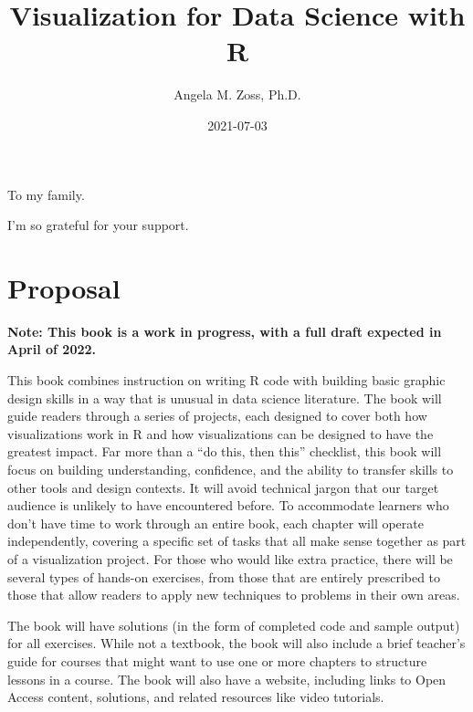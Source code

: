 \documentclass[
]{krantz}
\title{Visualization for Data Science with R}
\author{Angela M. Zoss, Ph.D.}
\date{2021-07-03}
\begin{document}
\maketitle


\thispagestyle{empty}

\begin{center}
To my family.

I'm so grateful for your support.
\end{center}

\setlength{\abovedisplayskip}{-5pt}
\setlength{\abovedisplayshortskip}{-5pt}

{
\hypersetup{linkcolor=}
\setcounter{tocdepth}{2}
\tableofcontents
}
\listoftables
\listoffigures
\hypertarget{proposal}{%
\chapter*{Proposal}\label{proposal}}


\textbf{Note: This book is a work in progress, with a full draft expected in April of 2022.}

This book combines instruction on writing R code with building basic graphic design skills in a way that is unusual in data science literature. The book will guide readers through a series of projects, each designed to cover both how visualizations work in R and how visualizations can be designed to have the greatest impact. Far more than a ``do this, then this'' checklist, this book will focus on building understanding, confidence, and the ability to transfer skills to other tools and design contexts. It will avoid technical jargon that our target audience is unlikely to have encountered before. To accommodate learners who don't have time to work through an entire book, each chapter will operate independently, covering a specific set of tasks that all make sense together as part of a visualization project. For those who would like extra practice, there will be several types of hands-on exercises, from those that are entirely prescribed to those that allow readers to apply new techniques to problems in their own areas.

The book will have solutions (in the form of completed code and sample output) for all exercises. While not a textbook, the book will also include a brief teacher's guide for courses that might want to use one or more chapters to structure lessons in a course. The book will also have a website, including links to Open Access content, solutions, and related resources like video tutorials.
\end{document}

